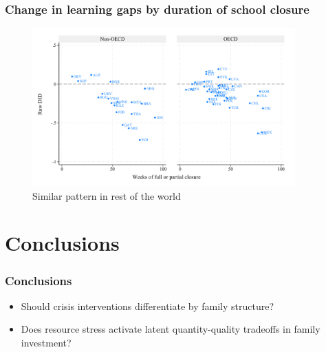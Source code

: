 \documentclass{beamer}
\begin{document}
\begin{frame}
    \label{frame:pisaclosure}
    \frametitle{Change in learning gaps by duration of school closure}
    
    \begin{figure}
        \centering
        \includegraphics[width=0.9\textwidth]{./FIGURES/Descriptive/PISA_raw_DID_PV4MATH_not_fully_open.pdf}
        \caption{Similar pattern in rest of the world}
        \label{fig:1b}
    \end{figure}
    
    
\end{frame}





\section{Conclusions}

\begin{frame}
    \label{frame:conclusions}
    \frametitle{Conclusions}
    \begin{itemize}
        \item Should crisis interventions differentiate by family structure?
        \item Does resource stress activate latent quantity-quality tradeoffs in family investment?
    \end{itemize}


\end{frame}
\end{document}
